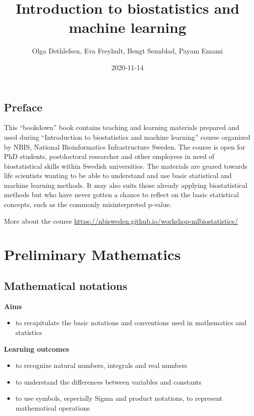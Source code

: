 \documentclass[
]{book}
\title{Introduction to biostatistics and machine learning}
\author{Olga Dethlefsen, Eva Freyhult, Bengt Sennblad, Payam Emami}
\date{2020-11-14}
\providecommand{\tightlist}{%
  \setlength{\itemsep}{0pt}\setlength{\parskip}{0pt}}
\theoremstyle{definition}
\theoremstyle{definition}
\theoremstyle{definition}
\theoremstyle{remark}
\begin{document}
\maketitle

{
\setcounter{tocdepth}{1}
\tableofcontents
}
\hypertarget{preface}{%
\chapter*{Preface}\label{preface}}

This ``bookdown'' book contains teaching and learning materials prepared and used during ``Introduction to biostatistics and machine learning'' course organized by NBIS, National Bioinformatics Infrastructure Sweden. The course is open for PhD students, postdoctoral researcher and other employees in need of biostatistical skills within Swedish universities. The materials are geared towards life scientists wanting to be able to understand and use basic statistical and machine learning methods. It may also suits those already applying biostatistical methods but who have never gotten a chance to reflect on the basic statistical concepts, such as the commonly misinterpreted p-value.

More about the course \url{https://nbisweden.github.io/workshop-mlbiostatistics/}

\hypertarget{part-preliminary-mathematics}{%
\part{Preliminary Mathematics}\label{part-preliminary-mathematics}}

\hypertarget{mathematical-notations}{%
\chapter{Mathematical notations}\label{mathematical-notations}}

\textbf{Aims}

\begin{itemize}
\tightlist
\item
  to recapitulate the basic notations and conventions used in mathematics and statistics
\end{itemize}

\textbf{Learning outcomes}

\begin{itemize}
\tightlist
\item
  to recognize natural numbers, integrals and real numbers
\item
  to understand the differences between variables and constants
\item
  to use symbols, especially Sigma and product notations, to represent mathematical operations
\end{itemize}
\end{document}
